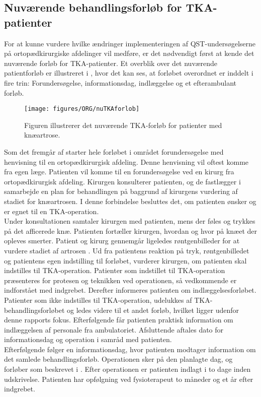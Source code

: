 \subsection{Nuværende behandlingsforløb for TKA-patienter}
For at kunne vurdere hvilke ændringer implementeringen af QST-undersøgelserne på ortopædkirurgiske afdelinger vil medføre, er det nødvendigt først at kende det nuværende forløb for TKA-patienter. Et overblik over det nuværende patientforløb er illustreret i , hvor det kan ses, at forløbet overordnet er inddelt i fire trin: Forundersøgelse, informationsdag, indlæggelse og et efterambulant forløb. 


\begin{figure}[H] 
	\begin{center}
		\texttt{[image: figures/ORG/nuTKAforlob]}
	\end{center}
	\caption{Figuren illustrerer det nuværende TKA-forløb for patienter med knæartrose.} 
	\label{nuTKAforlob} 
\end{figure} \vspace{-.25cm}


Som det fremgår af  starter hele forløbet i området forundersøgelse med henvisning til en ortopædkirurgisk afdeling. Denne henvisning vil oftest komme fra egen læge. Patienten vil komme til en forundersøgelse ved en kirurg fra ortopædkirurgisk afdeling. Kirurgen konsulterer patienten, og de fastlægger i samarbejde en plan for behandlingen på baggrund af kirurgens vurdering af stadiet for knæartrosen. I denne forbindelse besluttes det, om patienten ønsker og er egnet til en TKA-operation. \\
Under konsultationen samtaler kirurgen med patienten, mens der føles og trykkes på det afficerede knæ. Patienten fortæller kirurgen, hvordan og hvor på knæet der opleves smerter. Patient og kirurg gennemgår ligeledes røntgenbilleder for at vurdere stadiet af artrosen \citep{pritka2015}.
Ud fra patientens reaktion på tryk, røntgenbilledet og patientens egen indstilling til forløbet, vurderer kirurgen, om patienten skal indstilles til TKA-operation. Patienter som indstillet til TKA-operation præsenteres for protesen og teknikken ved operationen, så vedkommende er indforstået med indgrebet. Derefter informeres patienten om indlæggelsesforløbet. Patienter som ikke indstilles til TKA-operation, udelukkes af TKA-behandlingsforløbet og ledes videre til et andet forløb, hvilket ligger udenfor denne rapports fokus.
Efterfølgende får patienten praktisk information om indlæggelsen af personale fra ambulatoriet. Afsluttende aftales dato for informationsdag og operation i samråd med patienten. \citep{pritka2015} \\
Efterfølgende følger en informationsdag, hvor patienten modtager information om det samlede behandlingsforløb. Operationen sker på den planlagte dag, og forløber som beskrevet i . Efter operationen er patienten indlagt i to dage inden udskrivelse. Patienten har opfølgning ved fysioterapeut to måneder og et år efter indgrebet. \citep{pritka2015} 


